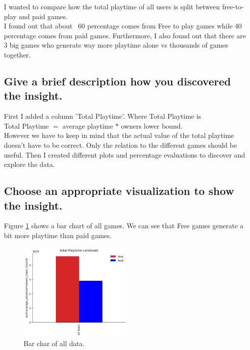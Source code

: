 \documentclass[11pt]{article}
\begin{document}
I wanted to compare how the total playtime of all users is split between free-to-play and paid games.\\
I found out that about ~60 percentage comes from Free to play games while 40 percentage comes from paid games. Furthermore, I also found out that there are 3 big games who generate way more playtime alone vs thousands of games together. 

\subsection{Give a brief description how you discovered the
insight.}

First I added a column 'Total Playtime'. Where Total Playtime is \\
Total Playtime $=$ average playtime $*$ owners lower bound.\\
However we have to keep in mind that the actual value of the total playtime doesn't have to be correct. Only the relation to the different games should be useful. 
Then I created different plots and percentage evaluations to discover and explore the data. 

\subsection{Choose an appropriate visualization to show the insight.}

Figure \ref{fig:insight1_1} shows a bar chart of all games. We can see that Free games generate a bit more playtime than paid games.\\ 
\begin{figure}[h]
    \centering
    \includegraphics[width=0.5\textwidth]{graphics/insight1_graph1.png}
    \caption{Bar char of all data.}
    \label{fig:insight1_1}
\end{figure}
\end{document}
